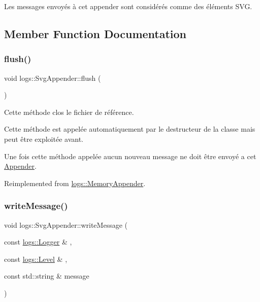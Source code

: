 Les messages envoyés à cet appender sont considérés comme des éléments S\+VG. 

\subsection{Member Function Documentation}
\mbox{\label{classlogs_1_1SvgAppender_a2ad23bf7a9d95d09684c0f352e3cea1a}} 
\subsubsection{\texorpdfstring{flush()}{flush()}}
{\footnotesize\ttfamily void logs\+::\+Svg\+Appender\+::flush (\begin{DoxyParamCaption}{ }\end{DoxyParamCaption})\hspace{0.3cm}{\ttfamily [virtual]}}



Cette méthode clos le fichier de référence. 

Cette méthode est appelée automatiquement par le destructeur de la classe mais peut être exploitée avant.

Une fois cette méthode appelée aucun nouveau message ne doit être envoyé a cet \hyperlink{classlogs_1_1Appender}{Appender}. 

Reimplemented from \hyperlink{classlogs_1_1MemoryAppender_a90fd2058402bceaff5e896ceee438df4}{logs\+::\+Memory\+Appender}.

\mbox{\label{classlogs_1_1SvgAppender_a9ec86931329330e976a213510d4d82e6}} 
\subsubsection{\texorpdfstring{write\+Message()}{writeMessage()}}
{\footnotesize\ttfamily void logs\+::\+Svg\+Appender\+::write\+Message (\begin{DoxyParamCaption}\item[{const \hyperlink{classlogs_1_1Logger}{logs\+::\+Logger} \&}]{,  }\item[{const \hyperlink{classlogs_1_1Level}{logs\+::\+Level} \&}]{,  }\item[{const std\+::string \&}]{message }\end{DoxyParamCaption})\hspace{0.3cm}{\ttfamily [virtual]}}



